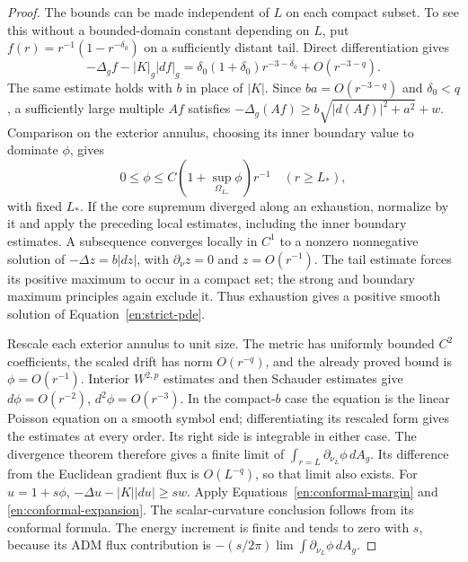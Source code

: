 \begin{proof}
The bounds can be made independent of $L$ on each compact subset.
To see this without a bounded-domain constant depending on $L$, put
$f(r)=r^{-1}(1-r^{-\delta_0})$ on a sufficiently distant tail.
Direct differentiation gives
\begin{equation}\label{en:tail-barrier}
 -\Delta_g f-|K|_g|df|_g
 =\delta_0(1+\delta_0)r^{-3-\delta_0}
      +O(r^{-3-q}).
\end{equation}
The same estimate holds with $b$ in place of $|K|$. Since
$ba=O(r^{-3-q})$ and $\delta_0<q$, a sufficiently large multiple
$A f$ satisfies
$-\Delta_g(Af)\geq b\sqrt{|d(Af)|^2+a^2}+w$.
Comparison on the exterior annulus, choosing its inner boundary
value to dominate $\phi$, gives
\begin{equation}\label{en:exhaustion-tail}
 0\leq\phi\leq C(1+\sup_{\Omega_{L_*}}\phi)r^{-1}
 \quad(r\geq L_*),
\end{equation}
with fixed $L_*$. If the core supremum diverged along an exhaustion,
normalize by it and apply the preceding local estimates, including
the inner boundary estimates. A subsequence converges locally in
$C^1$ to a nonzero nonnegative solution of
$-\Delta z=b|dz|$, with $\partial_\nu z=0$ and $z=O(r^{-1})$.
The tail estimate forces its positive maximum to occur in a compact
set; the strong and boundary maximum principles again exclude it.
Thus exhaustion gives a positive smooth solution of
Equation~\ref{en:strict-pde}.

Rescale each exterior annulus to unit size. The metric has uniformly
bounded $C^2$ coefficients, the scaled drift has norm $O(r^{-q})$,
and the already proved bound is $\phi=O(r^{-1})$. Interior
$W^{2,p}$ estimates and then Schauder estimates give
$d\phi=O(r^{-2})$, $d^2\phi=O(r^{-3})$.
In the compact-$b$ case the equation is the linear Poisson equation
on a smooth symbol end; differentiating its rescaled form gives the
estimates at every order. Its right side is integrable in either
case. The divergence theorem therefore gives a finite limit of
$\int_{r=L}\partial_{\nu_L}\phi\,dA_g$. Its difference from the
Euclidean gradient flux is $O(L^{-q})$, so that limit also exists.
For $u=1+s\phi$,
$-\Delta u-|K||du|\geq s w$. Apply
Equations~\ref{en:conformal-margin} and
\ref{en:conformal-expansion}. The scalar-curvature conclusion follows
from its conformal formula. The energy increment is finite and
tends to zero with $s$, because its ADM flux contribution is
$-(s/2\pi)\lim\int\partial_{\nu_L}\phi\,dA_g$.
\end{proof}

